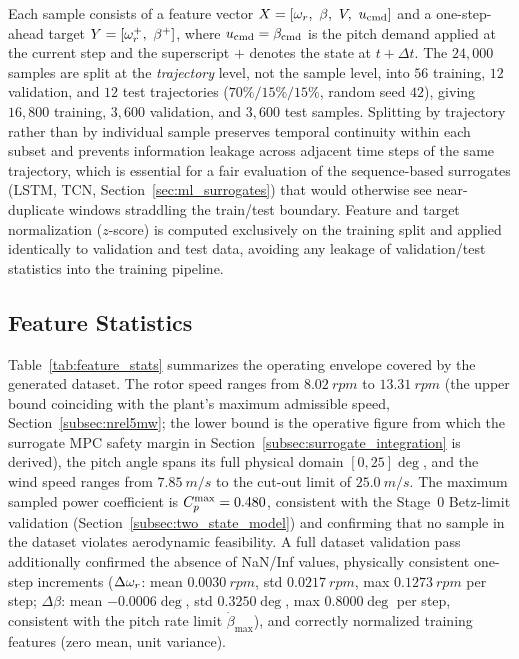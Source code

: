 Each sample consists of a feature vector
$X = [\omega_r,\ \beta,\ V,\ u_{\text{cmd}}]$ and a one-step-ahead target
$Y = [\omega_r^{+},\ \beta^{+}]$, where $u_{\text{cmd}} = \beta_{\text{cmd}}$ is the
pitch demand applied at the current step and the superscript $+$ denotes
the state at $t+\Delta t$. The $24{,}000$ samples are split at the
\emph{trajectory} level, not the sample level, into $56$ training, $12$
validation, and $12$ test trajectories ($70\%/15\%/15\%$, random seed
$42$), giving $16{,}800$ training, $3{,}600$ validation, and $3{,}600$ test
samples. Splitting by trajectory rather than by individual sample preserves
temporal continuity within each subset and prevents information leakage
across adjacent time steps of the same trajectory, which is essential for a
fair evaluation of the sequence-based surrogates (LSTM, TCN,
Section~\ref{sec:ml_surrogates}) that would otherwise see near-duplicate
windows straddling the train/test boundary. Feature and target
normalization ($z$-score) is computed exclusively on the training split and
applied identically to validation and test data, avoiding any leakage of
validation/test statistics into the training pipeline.

\subsection{Feature Statistics}
\label{subsec:feature_statistics}

Table~\ref{tab:feature_stats} summarizes the operating envelope covered by
the generated dataset. The rotor speed ranges from $\SI{8.02}{rpm}$ to
$\SI{13.31}{rpm}$ (the upper bound coinciding with the plant's maximum
admissible speed, Section~\ref{subsec:nrel5mw}; the lower bound is the
operative figure from which the surrogate MPC safety margin in
Section~\ref{subsec:surrogate_integration} is derived), the pitch angle spans its
full physical domain $[0,25]\deg$, and the wind speed ranges from
$\SI{7.85}{m/s}$ to the cut-out limit of $\SI{25.0}{m/s}$. The maximum
sampled power coefficient is $C_p^{\max} = 0.480$, consistent with the
Stage~0 Betz-limit validation (Section~\ref{subsec:two_state_model}) and
confirming that no sample in the dataset violates aerodynamic feasibility.
A full dataset validation pass additionally confirmed the absence of
NaN/Inf values, physically consistent one-step increments
($\Delta\omega_r$: mean $\SI{0.0030}{rpm}$, std $\SI{0.0217}{rpm}$, max
$\SI{0.1273}{rpm}$ per step; $\Delta\beta$: mean $-0.0006\deg$, std
$0.3250\deg$, max $0.8000\deg$ per step, consistent with the pitch rate
limit $\dot\beta_{\max}$), and correctly normalized training features
(zero mean, unit variance).

